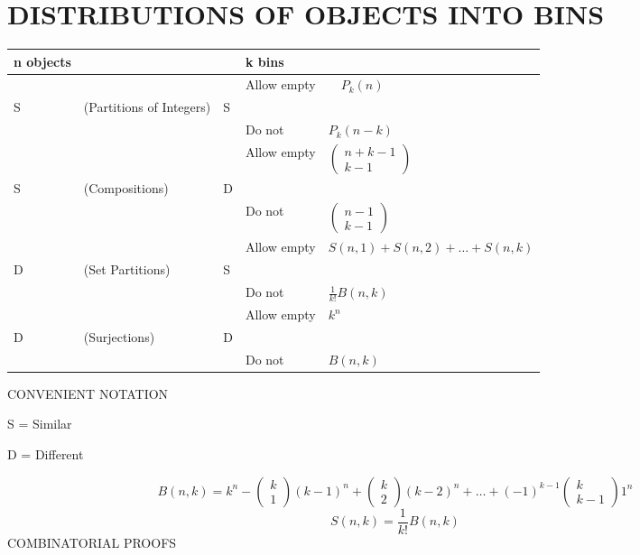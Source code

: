 \documentclass{article}
\begin{document}
\section[DISTRIBUTIONS OF OBJECTS INTO BINS]{DISTRIBUTIONS OF OBJECTS INTO BINS}
\begin{flushleft}
\tablefirsthead{}
\tablehead{}
\tabletail{}
\tablelasttail{}
\begin{supertabular}{m{0.75115985in}m{1.6636599in}m{0.30805984in}m{1.0288599in}m{2.37266in}}
n objects &
 &
 &
k bins &
\\\hline
 &
 &
 &
Allow empty &
\ \  $P_k(n)$\\
S &
(Partitions of Integers) &
S &
 &
\\
 &
 &
 &
Do not &
  $P_k(n-k)$\\\hline
 &
 &
 &
Allow empty &
  $\left(\begin{matrix}n+k-1\\k-1\end{matrix}\right)$\\
S &
(Compositions) &
D &
 &
\\
 &
 &
 &
Do not &
  $\left(\begin{matrix}n-1\\k-1\end{matrix}\right)$\\\hline
 &
 &
 &
Allow empty &
  $S\left(n,1\right)+S\left(n,2\right)+{\dots}+S(n,k)$\\
D &
(Set Partitions) &
S &
 &
\\
 &
 &
 &
Do not &
  $\frac 1{k!}B(n,k)$\\\hline
 &
 &
 &
Allow empty &
  $k^n$\\
D &
(Surjections) &
D &
 &
\\
 &
 &
 &
Do not &
  $B(n,k)$\\\hline
\end{supertabular}
\end{flushleft}
CONVENIENT NOTATION

S = Similar

D = Different

\begin{equation*}
B\left(n,k\right)=k^n-\left(\begin{matrix}k\\1\end{matrix}\right)\left(k-1\right)^n+\left(\begin{matrix}k\\2\end{matrix}\right)\left(k-2\right)^n+{\dots}+\left(-1\right)^{k-1}\left(\begin{matrix}k\\k-1\end{matrix}\right)1^n
\end{equation*}
\begin{equation*}
S\left(n,k\right)=\frac 1{k!}B\left(n,k\right)
\end{equation*}
COMBINATORIAL PROOFS
\end{document}
